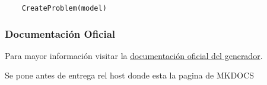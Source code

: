 \begin{lstlisting}
    CreateProblem(model)
\end{lstlisting}


\subsubsection{Documentación Oficial}
Para mayor información visitar la \href{https://github.com/FVSB/Tesis}{documentación oficial del generador}. 

Se pone antes de entrega rel host donde esta la pagina de MKDOCS
